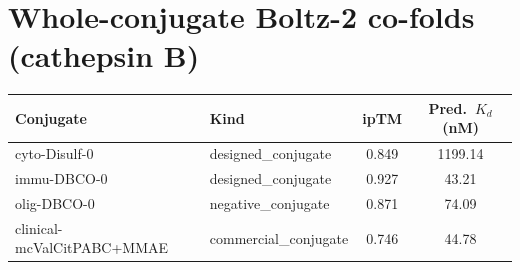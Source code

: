 \documentclass[10pt]{article}
\begin{document}
\section{Whole-conjugate Boltz-2 co-folds (cathepsin B)}
\begin{table}[h]\centering\small\begin{tabular}{l l c c}\toprule Conjugate & Kind & ipTM & Pred.\ $K_d$ (nM) \\ \midrule cyto-Disulf-0 & designed\_conjugate & 0.849 & 1199.14 \\
immu-DBCO-0 & designed\_conjugate & 0.927 & 43.21 \\
olig-DBCO-0 & negative\_conjugate & 0.871 & 74.09 \\
clinical-mcValCitPABC+MMAE & commercial\_conjugate & 0.746 & 44.78 \\ \bottomrule\end{tabular}\end{table}
\end{document}
